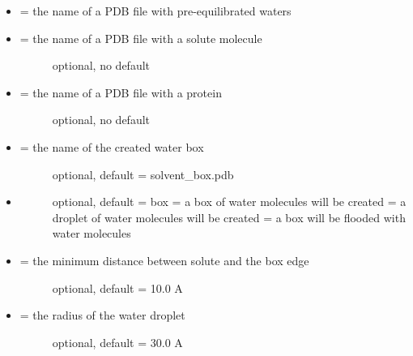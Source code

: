 \documentclass[letterpaper,10pt,english]{sphinxmanual}
\begin{document}
\begin{itemize}
\item {} 
 = the name of a PDB file with pre-equilibrated waters

\item {} \begin{description}
\item[{ = the name of a PDB file with a solute molecule}] \leavevmode
optional, no default

\end{description}

\item {} \begin{description}
\item[{ = the name of a PDB file with a protein}] \leavevmode
optional, no default

\end{description}

\item {} \begin{description}
\item[{ = the name of the created water box}] \leavevmode
optional, default = solvent\_box.pdb

\end{description}

\item {} \begin{description}
\item[{}] \leavevmode
optional, default = box
 = a box of water molecules will be created
 = a droplet of water molecules will be created
 = a box will be flooded with water molecules

\end{description}

\item {} \begin{description}
\item[{ = the minimum distance between solute and the box edge}] \leavevmode
optional, default = 10.0 A

\end{description}

\item {} \begin{description}
\item[{ = the radius of the water droplet}] \leavevmode
optional, default = 30.0 A


\end{description}
\end{itemize}
\end{document}
